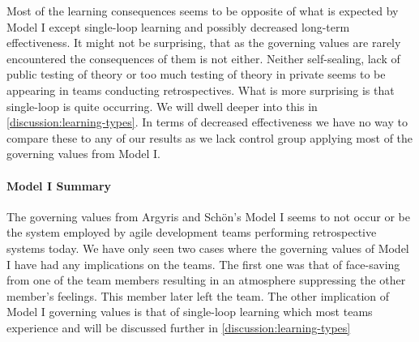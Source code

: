 Most of the learning consequences seems to be opposite of what is expected by Model I except single-loop learning and possibly decreased long-term effectiveness. It might not be surprising, that as the governing values are rarely encountered the consequences of them is not either. Neither self-sealing, lack of public testing of theory or too much testing of theory in private seems to be appearing in teams conducting retrospectives. What is more surprising is that single-loop is quite occurring. We will dwell deeper into this in \autoref{discussion:learning-types}. In terms of decreased effectiveness we have no way to compare these to any of our results as we lack control group applying most of the governing values from Model I. 

\paragraph{Model I Summary}
The governing values from Argyris and Schön's Model I seems to not occur or be the system employed by agile development teams performing retrospective systems today. We have only seen two cases where the governing values of Model I have had any implications on the teams. The first one was that of face-saving from one of the team members resulting in an atmosphere suppressing the other member's feelings. This member later left the team. The other implication of Model I governing values is that of single-loop learning which most teams experience and will be discussed further in \autoref{discussion:learning-types}

